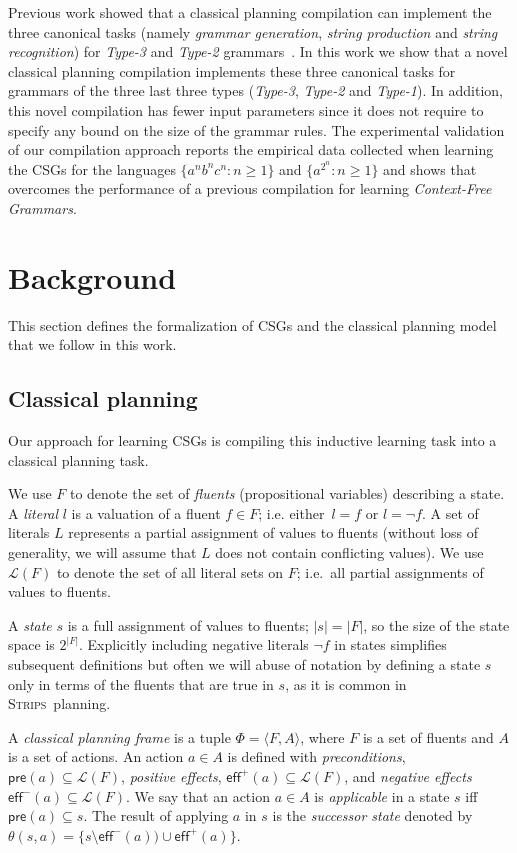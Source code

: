 \documentclass[letterpaper]{article} %
\newcommand{\tup}[1]{{\langle #1 \rangle}}
\newcommand{\pre}{\mathsf{pre}}     %
\newcommand{\eff}{\mathsf{eff}}     %
\newcommand{\strips}{\textsc{Strips}}     %
\begin{document}
Previous work showed that a classical planning compilation can implement the three canonical tasks (namely {\it grammar generation}, {\it string production} and {\it string recognition}) for {\em Type-3} and {\em Type-2} grammars~\cite{segovia2017generating}. In this work we show that a novel classical planning compilation implements these three canonical tasks for grammars of the three last three types ({\em Type-3}, {\em Type-2} and {\em Type-1}). In addition, this novel compilation has fewer input parameters since it does not require to specify any bound on the size of the grammar rules. The experimental validation of our compilation approach reports the empirical data collected when learning the CSGs for the languages $\{a^nb^nc^n : n \geq 1 \}$ and $\{a^{2^n} : n \geq 1 \}$ and shows that overcomes the performance  of a previous compilation for learning {\em Context-Free Grammars}.



\section{Background}
This section defines the formalization of CSGs and the classical planning model that we follow in this work.

\subsection{Classical planning}
Our approach for learning CSGs is compiling this inductive learning task into a classical planning task.

We use $F$ to denote the set of {\em fluents} (propositional variables) describing a state. A {\em literal} $l$ is a valuation of a fluent $f\in F$; i.e. either~$l=f$ or $l=\neg f$. A set of literals $L$ represents a partial assignment of values to fluents (without loss of generality, we will assume that $L$ does not contain conflicting values). We use $\mathcal{L}(F)$ to denote the set of all literal sets on $F$; i.e.~all partial assignments of values to fluents.

A {\em state} $s$ is a full assignment of values to fluents; $|s|=|F|$, so the size of the state space is $2^{|F|}$. Explicitly including negative literals $\neg f$ in states simplifies subsequent definitions but often we will abuse of notation by defining a state $s$ only in terms of the fluents that are true in $s$, as it is common in \strips\ planning.

A {\em classical planning frame} is a tuple $\Phi=\tup{F,A}$, where $F$ is a set of fluents and $A$ is a set of actions. An action $a\in A$ is defined with {\em preconditions}, $\pre(a)\subseteq\mathcal{L}(F)$, {\em positive effects}, $\eff^+(a)\subseteq\mathcal{L}(F)$, and {\em negative effects} $\eff^-(a)\subseteq\mathcal{L}(F)$. We say that an action $a\in A$ is {\em applicable} in a state $s$ iff $\pre(a)\subseteq s$. The result of applying $a$ in $s$ is the {\em successor state} denoted by $\theta(s,a)=\{s\setminus\eff^-(a))\cup\eff^+(a)\}$.
\end{document}
